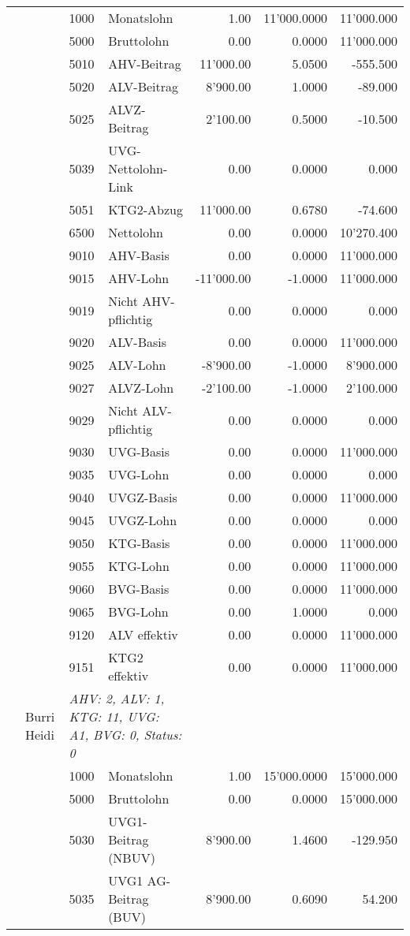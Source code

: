 \documentclass[15pt,a4paper]{article}
\begin{document}
\begin{longtable}{@{\extracolsep{\fill}}l l l l|r|r|r}
&&1000&Monatslohn&1.00&11'000.0000&11'000.000\\
&&5000&Bruttolohn&0.00&0.0000&11'000.000\\
&&5010&AHV-Beitrag&11'000.00&5.0500&-555.500\\
&&5020&ALV-Beitrag&8'900.00&1.0000&-89.000\\
&&5025&ALVZ-Beitrag&2'100.00&0.5000&-10.500\\
&&5039&UVG-Nettolohn-Link&0.00&0.0000&0.000\\
&&5051&KTG2-Abzug&11'000.00&0.6780&-74.600\\
&&6500&Nettolohn&0.00&0.0000&10'270.400\\
&&9010&AHV-Basis&0.00&0.0000&11'000.000\\
&&9015&AHV-Lohn&-11'000.00&-1.0000&11'000.000\\
&&9019&Nicht AHV-pflichtig&0.00&0.0000&0.000\\
&&9020&ALV-Basis&0.00&0.0000&11'000.000\\
&&9025&ALV-Lohn&-8'900.00&-1.0000&8'900.000\\
&&9027&ALVZ-Lohn&-2'100.00&-1.0000&2'100.000\\
&&9029&Nicht ALV-pflichtig&0.00&0.0000&0.000\\
&&9030&UVG-Basis&0.00&0.0000&11'000.000\\
&&9035&UVG-Lohn&0.00&0.0000&0.000\\
&&9040&UVGZ-Basis&0.00&0.0000&11'000.000\\
&&9045&UVGZ-Lohn&0.00&0.0000&0.000\\
&&9050&KTG-Basis&0.00&0.0000&11'000.000\\
&&9055&KTG-Lohn&0.00&0.0000&11'000.000\\
&&9060&BVG-Basis&0.00&0.0000&11'000.000\\
&&9065&BVG-Lohn&0.00&1.0000&0.000\\
&&9120&ALV effektiv&0.00&0.0000&11'000.000\\
&&9151&KTG2 effektiv&0.00&0.0000&11'000.000\\
\pagebreak
25&Burri Heidi&\multicolumn{2}{l|}{\small\emph{AHV: 2, ALV: 1, KTG: 11, UVG: A1, BVG: 0, Status: 0}}&& \\
&&1000&Monatslohn&1.00&15'000.0000&15'000.000\\
&&5000&Bruttolohn&0.00&0.0000&15'000.000\\
&&5030&UVG1-Beitrag (NBUV)&8'900.00&1.4600&-129.950\\
&&5035&UVG1 AG-Beitrag (BUV)&8'900.00&0.6090&54.200\\

\end{longtable}
\end{document}
